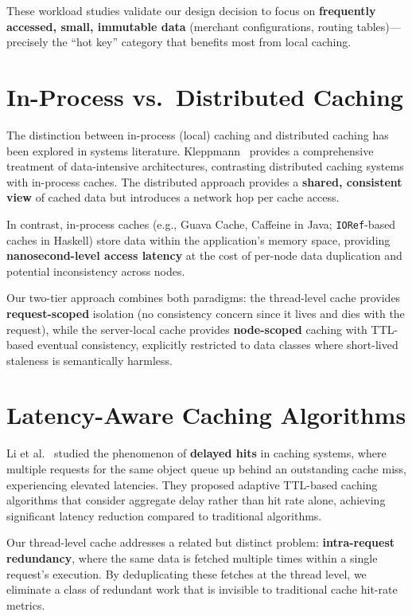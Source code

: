 \documentclass[12pt,a4paper]{report}
\begin{document}
These workload studies validate our design decision to focus on \textbf{frequently accessed, small, immutable data} (merchant configurations, routing tables)—precisely the ``hot key'' category that benefits most from local caching.

\section{In-Process vs.\ Distributed Caching}

The distinction between in-process (local) caching and distributed caching has been explored in systems literature. Kleppmann~\cite{kleppmann2021designing} provides a comprehensive treatment of data-intensive architectures, contrasting distributed caching systems with in-process caches. The distributed approach provides a \textbf{shared, consistent view} of cached data but introduces a network hop per cache access.

In contrast, in-process caches (e.g., Guava Cache, Caffeine in Java; \texttt{IORef}-based caches in Haskell) store data within the application's memory space, providing \textbf{nanosecond-level access latency} at the cost of per-node data duplication and potential inconsistency across nodes.

Our two-tier approach combines both paradigms: the thread-level cache provides \textbf{request-scoped} isolation (no consistency concern since it lives and dies with the request), while the server-local cache provides \textbf{node-scoped} caching with TTL-based eventual consistency, explicitly restricted to data classes where short-lived staleness is semantically harmless.

\section{Latency-Aware Caching Algorithms}

Li et al.~\cite{li2020caching} studied the phenomenon of \textbf{delayed hits} in caching systems, where multiple requests for the same object queue up behind an outstanding cache miss, experiencing elevated latencies. They proposed adaptive TTL-based caching algorithms that consider aggregate delay rather than hit rate alone, achieving significant latency reduction compared to traditional algorithms.

Our thread-level cache addresses a related but distinct problem: \textbf{intra-request redundancy}, where the same data is fetched multiple times within a single request's execution. By deduplicating these fetches at the thread level, we eliminate a class of redundant work that is invisible to traditional cache hit-rate metrics.
\end{document}
